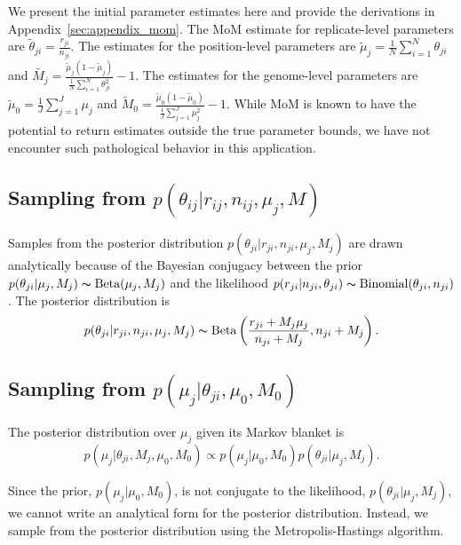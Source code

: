 \documentclass[11pt,reqno]{amsart}
\begin{document}
We present the initial parameter estimates here and provide the derivations in Appendix~\ref{sec:appendix_mom}. The MoM estimate for replicate-level parameters are 
$\tilde{\theta}_{ji} = \frac{r_{ji}} {n_{ji}}$. 
The estimates for the position-level parameters are 
$\tilde{\mu}_j = \frac{1}{N} \sum_{i=1}^N \theta_{ji}$ 
and 
$\tilde{M_j} = \frac{ \tilde{\mu}_j (1 - \tilde{\mu}_j ) } { \frac{1}{N} \sum_{i=1}^N \theta_{ji}^2 } -1$. 
The estimates for the genome-level parameters are 
$\tilde{\mu}_0 = \frac{1}{J} \sum_{j=1}^J \mu_j$ 
and 
$\tilde{M}_0 = \frac{ \tilde{\mu}_0 (1 - \tilde{\mu}_0 ) } {\frac{1}{J} \sum_{j=1}^J \mu_j^2 } -1$. 
While MoM is known to have the potential to return estimates outside the true parameter bounds, we have not encounter such pathological behavior in this application. 

\subsection{Sampling from $p \left( \theta_{ij} |r_{ij},n_{ij},\mu_j,M \right)$}

Samples from the posterior distribution 
$p(\theta_{ji} | r_{ji}, n_{ji}, \mu_j, M_j)$ 
are drawn analytically because of the Bayesian conjugacy between the prior 
$p(\theta_{ji} | \mu_j, M_j) \thicksim \text{Beta}(\mu_j, M_j)$ 
and the likelihood 
$p(r_{ji} | n_{ji}, \theta_{ji}) \thicksim \text{Binomial}(\theta_{ji}, n_{ji})$. 
The posterior distribution is 
\begin{equation}
	p(\theta_{ji} | r_{ji}, n_{ji}, \mu_j, M_j) \thicksim \text{Beta}\left( \frac{r_{ji} + M_j \mu_j}{n_{ji} + M_j} , n_{ji} + M_j\right).
\end{equation}

\subsection{Sampling from $p \left( \mu_j |\theta_{ji},\mu_0,M_0\right)$}
The posterior distribution over $\mu_j$ given its Markov blanket is 
\begin{equation}
	p( \mu_j | \theta_{ji}, M_j, \mu_0, M_0 ) \propto p(\mu_j | \mu_0, M_0) p(\theta_{ji} | \mu_j, M_j).
\end{equation}

Since the prior, $p(\mu_j | \mu_0, M_0)$, is not conjugate to the likelihood, $p(\theta_{ji} | \mu_j, M_j)$, we cannot write an analytical form for the posterior distribution. Instead, we sample from the posterior distribution using the Metropolis-Hastings algorithm.
\end{document}

